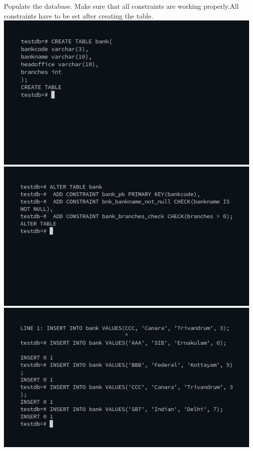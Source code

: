 \documentclass[10pt,a4paper,titlepage]{report}
\begin{document}
{\begin{enumerate}
\begin{enumerate}
			Populate the database. Make sure that all constraints are working properly.All constraints have to be set after creating the table.\newline
			\includegraphics[width=\linewidth]{../Images/Constraints/8.png}\newline
			\includegraphics[width=\linewidth]{../Images/Constraints/9.png}\newline
			\includegraphics[width=\linewidth]{../Images/Constraints/10.png}\newline

\end{enumerate}
\end{enumerate}}
\end{document}
